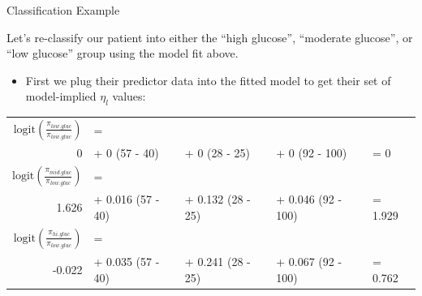 \documentclass{beamer}\usepackage[]{graphicx}\usepackage[]{color}
\begin{document}
\begin{frame}{Classification Example}
  


Let's re-classify our patient into either the ``high glucose'', ``moderate 
glucose'', or ``low glucose'' group using the model fit above.
\begin{itemize}
\item First we plug their predictor data into the fitted model to get their 
  set of model-implied $\eta_l$ values:
\end{itemize}

\vc

\setlength\tabcolsep{1.5pt} %

\begin{tabular}{rllll}
  $\text{logit}\left(\frac{\pi_{low.gluc}}{\pi_{low.gluc}}\right)$ &=&&&\\ 
  0 &+ 0 (57 - 40) &+ 0 (28 - 25) &+ 0 (92 - 100) &= 
  0\\[8pt]
  $\text{logit}\left(\frac{\pi_{mid.gluc}}{\pi_{low.gluc}}\right)$ &=&&&\\
  1.626 &+ 0.016 (57 - 40) &+ 0.132 (28 - 25) &+ 0.046 (92 - 100) &=
  1.929\\[8pt]
  $\text{logit}\left(\frac{\pi_{hi.gluc}}{\pi_{low.gluc}}\right)$ &=&&&\\
  -0.022 &+ 0.035 (57 - 40) &+ 0.241 (28 - 25) &+ 0.067 (92 - 100) &=
  0.762
\end{tabular}

\setlength\tabcolsep{6pt} %

\pagebreak


\end{frame}
\end{document}
